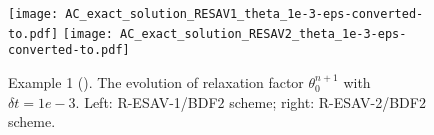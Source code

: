 \documentclass[final,review,onefignum,onetabnum]{siamart190516}
\theoremstyle{plain}
\begin{document}
\begin{figure}[htbp]
	\centering
	\texttt{[image: AC\_exact\_solution\_RESAV1\_theta\_1e-3-eps-converted-to.pdf]}
	\texttt{[image: AC\_exact\_solution\_RESAV2\_theta\_1e-3-eps-converted-to.pdf]}\hspace{-6mm}
	\caption{Example 1 (). The evolution of relaxation factor $\theta_{0}^{n+1}$ with $\delta t=1e-3$. Left: R-ESAV-1/BDF$2$ scheme; right: R-ESAV-2/BDF$2$ scheme.}
	\label{Fig:AC-exact-solution-zeta}
\end{figure} 


\end{document}
